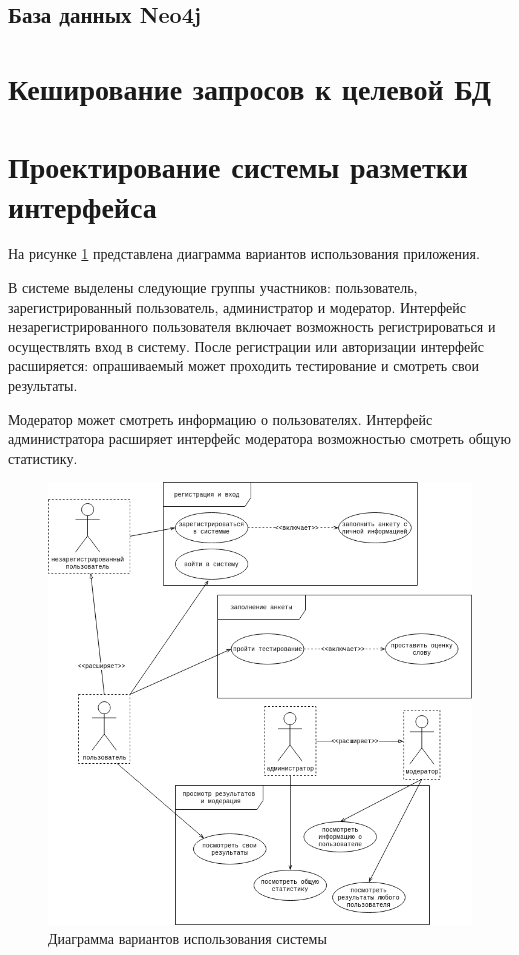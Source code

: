 \subsection{База данных Neo4j}
\section{Кеширование запросов к целевой БД}
\section{\protect\justifying\protect\RaggedRight Проектирование системы разметки интерфейса}
На рисунке \ref{fig:usecase} представлена диаграмма вариантов использования приложения. 

В системе выделены следующие группы участников: пользователь, зарегистрированный пользователь, администратор и модератор. Интерфейс незарегистрированного пользователя включает возможность регистрироваться и осуществлять вход в систему. После регистрации или авторизации интерфейс расширяется: опрашиваемый может проходить тестирование и смотреть свои результаты. 

Модератор может смотреть информацию о пользователях. Интерфейс администратора расширяет интерфейс модератора возможностью смотреть общую статистику.   
\begin{center}
	\begin{figure}[H]
		\centering
		\includegraphics[width=0.85\linewidth]{assets/term-uc.drawio.png}
		\caption{Диаграмма вариантов использования системы}
		\label{fig:usecase}
	\end{figure}
\end{center}

